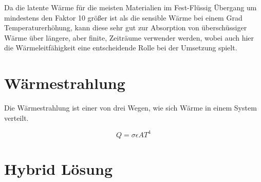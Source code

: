 Da die latente Wärme für die meisten Materialien im Fest-Flüssig Übergang um mindestens den Faktor 10 größer ist als die sensible Wärme bei
einem Grad Temperaturerhöhung, kann diese sehr gut zur Absorption von überschüssiger Wärme über längere, aber finite, Zeiträume verwender werden,
wobei auch hier die Wärmeleitfähigkeit eine entscheidende Rolle bei der Umsetzung spielt.

\section{Wärmestrahlung}\label{sec:radiator}
Die Wärmestrahlung ist einer von drei Wegen, wie sich Wärme in einem System verteilt.

\begin{equation}
    Q=\sigma\epsilon A T^{4}
\end{equation}

\section{Hybrid Lösung}
\label{sec:hybridloesung}

\newpage
